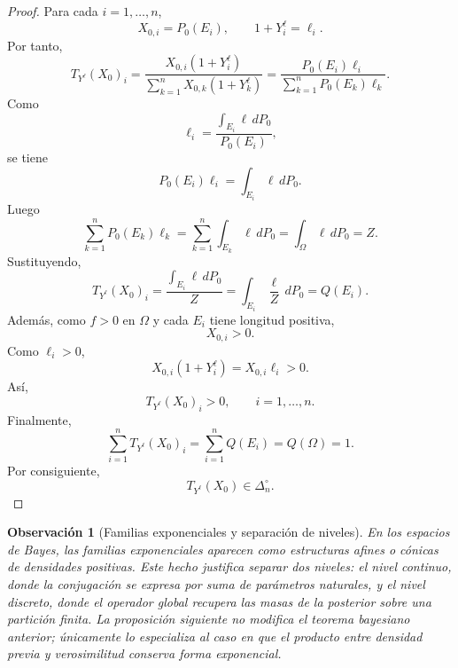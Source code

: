 \documentclass[12pt]{article}
\newtheorem{observacion}{Observación}[section]
\begin{document}
\begin{proof}
Para cada $i=1,\dots,n$,
\[
X_{0,i}=P_0(E_i),
\qquad
1+Y_i^\ell=\ell_i.
\]
Por tanto,
\[
T_{Y^\ell}(X_0)_i
=
\frac{X_{0,i}(1+Y_i^\ell)}{\displaystyle\sum_{k=1}^nX_{0,k}(1+Y_k^\ell)}
=
\frac{P_0(E_i)\ell_i}{\displaystyle\sum_{k=1}^nP_0(E_k)\ell_k}.
\]
Como
\[
\ell_i
=
\frac{\displaystyle\int_{E_i}\ell\,dP_0}{P_0(E_i)},
\]
se tiene
\[
P_0(E_i)\ell_i
=
\int_{E_i}\ell\,dP_0.
\]
Luego
\[
\sum_{k=1}^nP_0(E_k)\ell_k
=
\sum_{k=1}^n\int_{E_k}\ell\,dP_0
=
\int_\Omega\ell\,dP_0
=Z.
\]
Sustituyendo,
\[
T_{Y^\ell}(X_0)_i
=
\frac{\displaystyle\int_{E_i}\ell\,dP_0}{Z}
=
\int_{E_i}\frac{\ell}{Z}\,dP_0
=Q(E_i).
\]
Además, como $f>0$ en $\Omega$ y cada $E_i$ tiene longitud positiva,
\[
X_{0,i}>0.
\]
Como $\ell_i>0$,
\[
X_{0,i}(1+Y_i^\ell)=X_{0,i}\ell_i>0.
\]
Así,
\[
T_{Y^\ell}(X_0)_i>0,
\qquad i=1,\dots,n.
\]
Finalmente,
\[
\sum_{i=1}^nT_{Y^\ell}(X_0)_i
=
\sum_{i=1}^nQ(E_i)
=
Q(\Omega)
=1.
\]
Por consiguiente,
\[
T_{Y^\ell}(X_0)\in\Delta_n^\circ.
\]
\end{proof}

\begin{observacion}[Familias exponenciales y separación de niveles]
En los espacios de Bayes, las familias exponenciales aparecen como estructuras afines o cónicas de densidades positivas. Este hecho justifica separar dos niveles: el nivel continuo, donde la conjugación se expresa por suma de parámetros naturales, y el nivel discreto, donde el operador global recupera las masas de la posterior sobre una partición finita. La proposición siguiente no modifica el teorema bayesiano anterior; únicamente lo especializa al caso en que el producto entre densidad previa y verosimilitud conserva forma exponencial.
\end{observacion}
\end{document}
